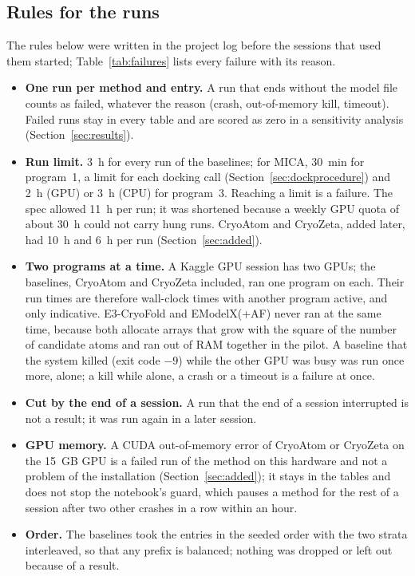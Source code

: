 \subsection{Rules for the runs}
The rules below were written in the project log before the sessions that used them started; Table~\ref{tab:failures} lists every failure with its reason.
\begin{itemize}
\item \textbf{One run per method and entry.} A run that ends without the model file counts as failed, whatever the reason (crash, out-of-memory kill, timeout). Failed runs stay in every table and are scored as zero in a sensitivity analysis (Section~\ref{sec:results}).
\item \textbf{Run limit.} 3~h for every run of the baselines; for MICA, 30~min for program~1, a limit for each docking call (Section~\ref{sec:dockprocedure}) and 2~h (GPU) or 3~h (CPU) for program~3. Reaching a limit is a failure. The spec allowed 11~h per run; it was shortened because a weekly GPU quota of about 30~h could not carry hung runs. CryoAtom and CryoZeta, added later, had 10~h and 6~h per run (Section~\ref{sec:added}).
\item \textbf{Two programs at a time.} A Kaggle GPU session has two GPUs; the baselines, CryoAtom and CryoZeta included, ran one program on each. Their run times are therefore wall-clock times with another program active, and only indicative. E3-CryoFold and EModelX(+AF) never ran at the same time, because both allocate arrays that grow with the square of the number of candidate atoms and ran out of RAM together in the pilot. A baseline that the system killed (exit code $-9$) while the other GPU was busy was run once more, alone; a kill while alone, a crash or a timeout is a failure at once.
\item \textbf{Cut by the end of a session.} A run that the end of a session interrupted is not a result; it was run again in a later session.
\item \textbf{GPU memory.} A CUDA out-of-memory error of CryoAtom or CryoZeta on the 15~GB GPU is a failed run of the method on this hardware and not a problem of the installation (Section~\ref{sec:added}); it stays in the tables and does not stop the notebook's guard, which pauses a method for the rest of a session after two other crashes in a row within an hour.
\item \textbf{Order.} The baselines took the entries in the seeded order with the two strata interleaved, so that any prefix is balanced; nothing was dropped or left out because of a result.
\end{itemize}

